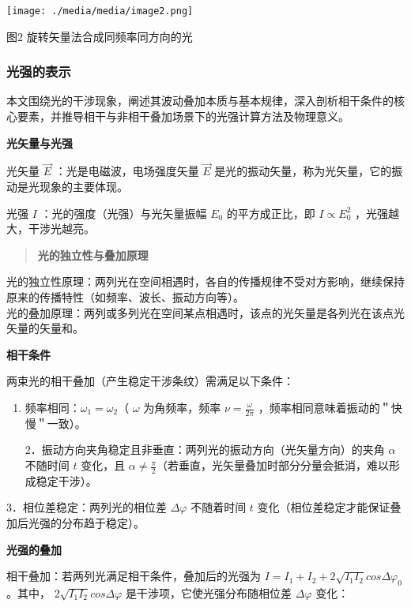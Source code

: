 \documentclass[
]{article}
\begin{document}
\texttt{[image: ./media/media/image2.png]}

图2 旋转矢量法合成同频率同方向的光

\hypertarget{ux5149ux5f3aux7684ux8868ux793a}{%
\subsubsection{光强的表示}\label{ux5149ux5f3aux7684ux8868ux793a}}

本文围绕光的干涉现象，阐述其波动叠加本质与基本规律，深入剖析相干条件的核心要素，并推导相干与非相干叠加场景下的光强计算方法及物理意义。

\textbf{光矢量与光强}

光矢量 \(\overrightarrow{E}\) ：光是电磁波，电场强度矢量 \(\overrightarrow{E}\) 是光的振动矢量，称为光矢量，它的振动是光现象的主要体现。

光强 \(I\) ：光的强度（光强）与光矢量振幅 \(E_{0}\) 的平方成正比，即 \(I \propto E_{0}^{2}\) ，光强越大，干涉光越亮。

\begin{quote}
\textbf{光的独立性与叠加原理}
\end{quote}

光的独立性原理：两列光在空间相遇时，各自的传播规律不受对方影响，继续保持原来的传播特性（如频率、波长、振动方向等）。\\
光的叠加原理：两列或多列光在空间某点相遇时，该点的光矢量是各列光在该点光矢量的矢量和。

\textbf{相干条件}

两束光的相干叠加（产生稳定干涉条纹）需满足以下条件：

\begin{enumerate}
\def\labelenumi{\arabic{enumi}.}
\item
  频率相同：\(\omega_{1} = \omega_{2}\)（ \(\omega\) 为角频率，频率 \(\nu = \frac{\omega}{2\pi}\) ，频率相同意味着振动的＂快慢＂一致）。

  2．振动方向夹角稳定且非垂直：两列光的振动方向（光矢量方向）的夹角 \(\alpha\) 不随时间 \(t\) 变化，且 \(\alpha \neq \frac{\pi}{2}\)（若垂直，光矢量叠加时部分分量会抵消，难以形成稳定干涉）。
\end{enumerate}

3．相位差稳定：两列光的相位差 \(\Delta\varphi\) 不随着时间 \(t\) 变化（相位差稳定才能保证叠加后光强的分布趋于稳定）。

\textbf{光强的叠加}

相干叠加：若两列光满足相干条件，叠加后的光强为 \(I = I_{1} + I_{2} + 2\sqrt{I_{1}I_{2}}cos\Delta\varphi_{0}\) 。其中， \(2\sqrt{I_{1}I_{2}}cos\Delta\varphi\) 是干涉项，它使光强分布随相位差 \(\Delta\varphi\) 变化：
\end{document}
